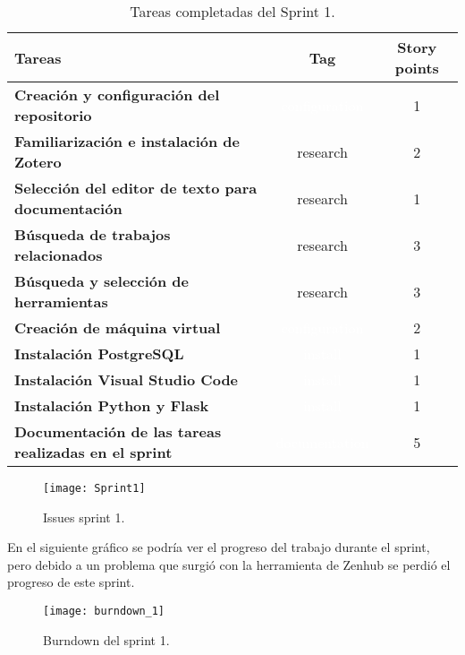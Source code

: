 \begin{table}[ht!]
    \centering
    \resizebox{15cm}{!} {
    \begin{tabular}{|l|c|c|}
    \hline
    \rowcolor[rgb]{0.99,0.93,0.93}
    \textbf{Tareas}     &\textbf{Tag}     & \textbf{Story points} \\ \hline
    \textbf{Creación y configuración del repositorio}         &\cellcolor[rgb]{0.93,0.35,0.0}\textcolor{white}{configuration}      &1 \\ \hline 
    \textbf{Familiarización e instalación de Zotero}         &\cellcolor[rgb]{0.6,1.0,0.6}research      &2 \\ \hline
    \textbf{Selección del editor de texto para documentación}         &\cellcolor[rgb]{0.6,1.0,0.6}research      &1 \\ \hline 
    \textbf{Búsqueda de trabajos relacionados}         &\cellcolor[rgb]{0.6,1.0,0.6}research      &3 \\ \hline 
    \textbf{Búsqueda y selección de herramientas}          &\cellcolor[rgb]{0.6,1.0,0.6}research      &3 \\ \hline 
    \textbf{Creación de máquina virtual}         &\cellcolor[rgb]{0.93,0.35,0.0}\textcolor{white}{configuration}      &2 \\ \hline 
    \textbf{Instalación PostgreSQL}         &\cellcolor[rgb]{0.93,0.75,0.0}\textcolor{white}{install}      &1 \\ \hline 
    \textbf{Instalación Visual Studio Code}         &\cellcolor[rgb]{0.93,0.75,0.0}\textcolor{white}{install}      &1 \\ \hline 
    \textbf{Instalación Python y Flask}         &\cellcolor[rgb]{0.93,0.75,0.0}\textcolor{white}{install}      &1 \\ \hline 
    \textbf{Documentación de las tareas realizadas en el sprint}         &\cellcolor[rgb]{0.0,0.33,0.71}\textcolor{white}{documentation}      &5 \\ \hline 
    \end{tabular}}
    \caption{Tareas completadas del Sprint 1.}
    \label{tab:my_label}
\end{table}
\newpage
\begin{figure}[htb]
    \centering
    \texttt{[image: Sprint1]}
    \caption{Issues sprint 1.}
    \label{fig:Sprint1}
\end{figure}
\newpage

En el siguiente gráfico se podría ver el progreso del trabajo durante el sprint, pero debido a un problema que surgió con la herramienta de Zenhub se perdió el progreso de este sprint.
\begin{figure}[htb]
    \centering
    \texttt{[image: burndown\_1]}
    \caption{Burndown del sprint 1.}
    \label{fig:burndown_1}
\end{figure}

